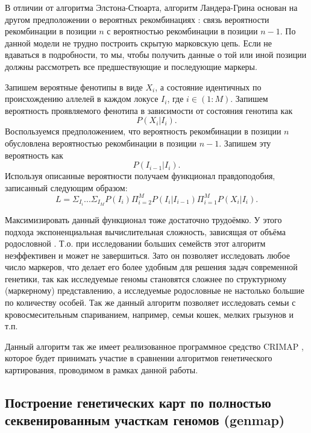 \documentclass{matmex-diploma-custom}
\begin{document}
В отличии от алгоритма Элстона-Стюарта, алгоритм Ландера-Грина основан
на другом предположении о вероятных рекомбинациях
\cite{lander1987construction}: связь вероятности рекомбинации в
позиции $n$ с вероятностью рекомбинации в позиции $n-1$. По данной
модели не трудно построить скрытую марковскую цепь. Если не вдаваться
в подробности, то мы, чтобы получить данные о той или иной позиции
должны рассмотреть все предшествующие и последующие маркеры.

Запишем вероятные фенотипы в виде $X_{i}$, а состояние идентичных по
происхождению аллелей в каждом локусе $I_{i}$, где $i \in
(1:M)$. Запишем вероятность проявляемого фенотипа в зависимости от
состояния генотипа как $$P( X_{i} | I_{i}).$$ Воспользуемся
предположением, что вероятность рекомбинации в позиции $n$ обусловлена
вероятностью рекомбинации в позиции $n-1$. Запишем эту вероятность
как $$P(I_{i-1}|I_{i}).$$ Используя описанные вероятности получаем
функционал правдоподобия, записанный следующим образом: $$L =
\Sigma_{I_{i}}...\Sigma_{I_{M}}P(I_{i})\Pi_{i=2}^{M}P(I_{i}|I_{i-1})\Pi^{M}_{i=1}P(X_{i}|I_{i}).$$

Максимизировать данный функционал тоже достаточно трудоёмко. У этого
подхода экспоненциальная вычислительная сложность, зависящая от объёма
родословной \cite{lander, fishelson2002exact}. Т.о. при исследовании
больших семейств этот алгоритм неэффективен и может не
завершиться. Зато он позволяет исследовать любое число маркеров, что
делает его более удобным для решения задач современной генетики, так
как исследуемые геномы становятся сложнее по структурному (маркерному)
представлению, а исследуемые родословные не настолько большие по
количеству особей. Так же данный алгоритм позволяет исследовать семьи
с кровосмесительным спариванием, например, семьи кошек, мелких
грызунов и т.п.

Данный алгоритм так же имеет реализованное программное средство CRIMAP
\cite{crimap}, которое будет принимать участие в сравнении алгоритмов
генетического картирования, проводимом в рамках данной работы.

\subsection{Построение генетических карт по полностью секвенированным
 участкам геномов (genmap)}
\end{document}
